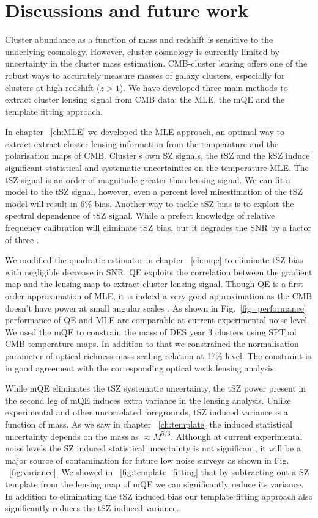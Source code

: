 \chapter{Discussions and future work}

Cluster abundance as a function of mass and redshift is sensitive to the underlying cosmology. However, cluster cosmology is currently limited by uncertainty in the cluster mass estimation. CMB-cluster lensing offers one of the robust ways to accurately measure masses of galaxy clusters, especially for clusters at high redshift ($z  > 1$).
We have developed three main methods to extract cluster lensing signal from CMB data: the MLE, the mQE and the template fitting approach. 

In chapter ~\ref{ch:MLE} we developed the MLE approach, an optimal way to extract extract cluster lensing information from the temperature and the polarisation maps of CMB.	  
Cluster's own SZ signals, the tSZ and the kSZ induce significant statistical and systematic uncertainties on the temperature MLE. 
The tSZ signal is an order of magnitude greater than lensing signal. 
We can fit a model to the tSZ signal, however, even a percent level misestimation of the tSZ model will result in 6\% bias.
Another way to tackle tSZ bias is to exploit the spectral dependence of tSZ signal. 
While a prefect knowledge of relative frequency calibration will eliminate tSZ bias, but it degrades the SNR by a factor of three \citep{baxter15}.
  
We modified the quadratic estimator in chapter ~\ref{ch:mqe} to eliminate tSZ bias with negligible decrease in SNR. 
QE exploits the correlation between the gradient map and the lensing map to extract cluster lensing signal. 
Though QE is a first order approximation of MLE, it is indeed a very good approximation as the CMB doesn't have power at small angular scales \citep{silk68}.
As shown in Fig.~\ref{fig_performance} performance of QE and MLE are comparable at current experimental noise level. 
 We used the mQE to constrain the mass of DES year 3 clusters using SPTpol CMB temperature maps. 
 In addition to that we constrained the normalisation parameter of optical richness-mass scaling relation at 17\% level. 
 The constraint is in good agreement with the corresponding optical weak lensing analysis.
 
 While mQE eliminates the tSZ systematic uncertainty, the tSZ power present in the second leg of mQE induces extra variance in the lensing analysis. 
 Unlike experimental and other uncorrelated foregrounds, tSZ induced variance is a function of mass. 
 As we saw in chapter ~\ref{ch:template} the induced statistical uncertainty depends on the mass as $\approx M^{5/3}$. 
 Although at current experimental noise levels the SZ induced statistical uncertainty is not significant, it will be a major source of contamination for future low noise surveys as shown in Fig. ~\ref{fig:variance}. We showed in ~\ref{fig:template_fitting} that by subtracting out a SZ template from the lensing map of mQE we can significantly reduce its variance. In addition to eliminating the tSZ induced bias our template fitting approach also significantly reduces the tSZ induced variance. 
 
